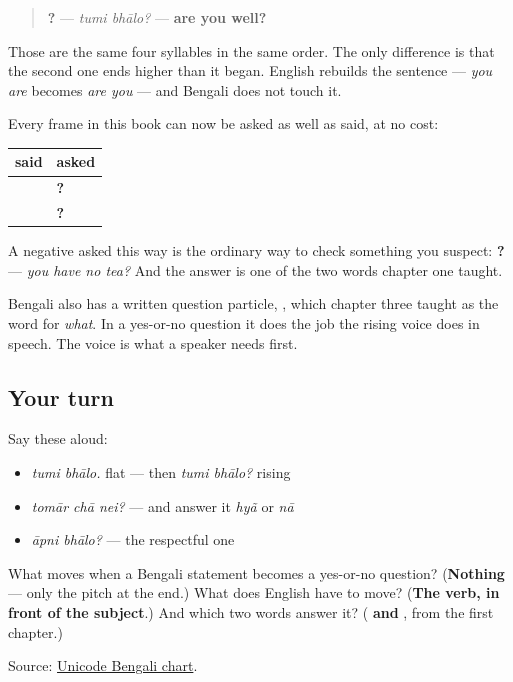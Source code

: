 \begin{quote}
\textbf{ ?} — \emph{tumi bhālo?} — \textbf{are you well?}
\end{quote}

Those are the same four syllables in the same order. The only difference is that the second one ends higher than it began. English rebuilds the sentence — \emph{you are} becomes \emph{are you} — and Bengali does not touch it.

\begin{grammarlens}[title={Grammar Lens: what the rise turns into a question}]
Every frame in this book can now be asked as well as said, at no cost:

\noindent
\begin{tabularx}{\linewidth}{@{}>{\raggedright\arraybackslash}X>{\raggedright\arraybackslash}X@{}}
\toprule
\textbf{said} & \textbf{asked} \\
\midrule
\textbf{\bn{আমার} \bn{চা} \bn{নেই}} & \textbf{\bn{তোমার} \bn{চা} \bn{নেই}?} \\
\textbf{\bn{তুমি} \bn{ভাত} \bn{খাও}} & \textbf{\bn{তুমি} \bn{ভাত} \bn{খাও}?} \\
\bottomrule
\end{tabularx}

A negative asked this way is the ordinary way to check something you suspect: \textbf{  ?} — \emph{you have no tea?} And the answer is one of the two words chapter one taught.

Bengali also has a written question particle, \textbf{}, which chapter three taught as the word for \emph{what}. In a yes-or-no question it does the job the rising voice does in speech. The voice is what a speaker needs first.
\end{grammarlens}

\subsection*{Your turn}
Say these aloud:

\begin{itemize}
\raggedright
  \item \emph{tumi bhālo.} flat — then \emph{tumi bhālo?} rising
  \item \emph{tomār chā nei?} — and answer it \emph{hyã} or \emph{nā}
  \item \emph{āpni bhālo?} — the respectful one
\end{itemize}

\begin{tcolorbox}[breakable,colback=teal!4,colframe=teal!35!black,title={Before you move on}]
What moves when a Bengali statement becomes a yes-or-no question? (\textbf{Nothing} — only the pitch at the end.) What does English have to move? (\textbf{The verb, in front of the subject}.) And which two words answer it? (\textbf{ and }, from the first chapter.)

Source: \href{https://www.unicode.org/charts/PDF/U0980.pdf}{Unicode Bengali chart}.
\end{tcolorbox}

